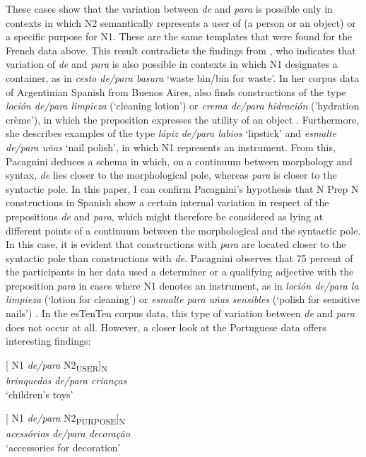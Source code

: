 \documentclass[output=paper]{langsci/langscibook}
\begin{document}
These cases show that the variation between \textit{de} and \textit{para} is possible only in contexts in which N2 semantically represents a user of (a person or an object) or a specific purpose for N1. These are the same templates that were found for the French data above. This result contradicts the findings from \citet{Lopez:1970}, who indicates that variation of \textit{de} and \textit{para} is also possible in contexts in which N1 designates a container, as in \textit{cesto de/para basura} `waste bin/bin for waste'. In her corpus data of Argentinian Spanish from Buenos Aires, \citet{Pacagnini:2003} also finds constructions of the type \textit{loción de/para limpieza} (`cleaning lotion') or \textit{crema de/para hidración} ('hydration crème'), in which the preposition expresses the utility of an object \citep[164]{Pacagnini:2003}. Furthermore, she describes examples of the type \textit{lápiz de/para labios} `lipstick' and \textit{esmalte de/para uñas} `nail polish', in which N1 represents an instrument. From this, Pacagnini deduces a schema in which, on a continuum between morphology and syntax, \textit{de} lies closer to the morphological pole, whereas \textit{para} is closer to the syntactic pole. In this paper, I can confirm Pacagnini’s hypothesis that N Prep N constructions in Spanish show a certain internal variation in respect of the prepositions \textit{de} and \textit{para}, which might therefore be considered as lying at different points of a continuum between the morphological and the syntactic pole. In this case, it is evident that constructions with \textit{para} are located closer to the syntactic pole than constructions with \textit{de}. Pacagnini observes that 75 percent of the participants in her data used a determiner or a qualifying adjective with the preposition \textit{para} in cases where N1 denotes an instrument, as in \textit{loción de/para la limpieza} (`lotion for cleaning') or \textit{esmalte para uñas sensibles} (`polish for sensitive nails') \citep[166]{Pacagnini:2003}. In the esTenTen corpus data, this type of variation between \textit{de} and \textit{para} does not occur at all. However, a closer look at the Portuguese data offers interesting findings: \\ 

\begin{exe}\ex\begin{minipage}[t]{0.4\textwidth}    %
[ N1 \textit{de/para} N2\textsubscript{USER}]\textsubscript{N}\\
\textit{brinquedos de/para crianças}\\
`children’s toys'
\end{minipage}\hfill%
\begin{minipage}[t]{0.45\textwidth}
[ N1 \textit{de/para} N2\textsubscript{PURPOSE}]\textsubscript{N}\\
\textit{acessórios de/para decoração}\\
`accessories for decoration'
\end{minipage}
\end{exe}
\end{document}
